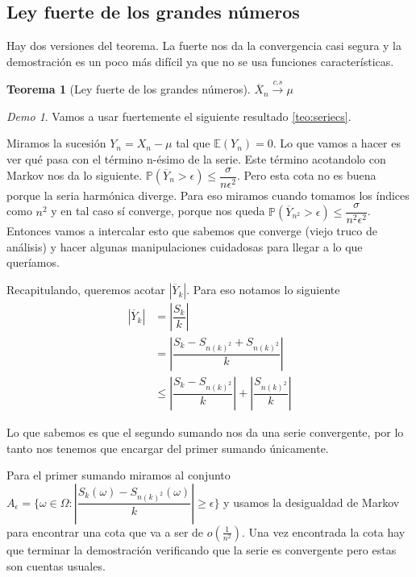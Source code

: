 \documentclass[11pt]{article}
\theoremstyle{plain} %
\newtheorem{teorema}{Teorema}
\theoremstyle{definition}
\theoremstyle{remark}
\newtheorem*{demo}{Demo}
\def\Om{\Omega}
\def\E{\mathbb{E}}
\def\P{\mathbb{P}}
\renewcommand\qed{\ding{110}}
\begin{document}
\subsection{Ley fuerte de los grandes números}

Hay dos versiones del teorema. La fuerte nos da la convergencia casi segura y la demostración es un poco más difícil ya que no se usa funciones características. 

\begin{teorema}
	[Ley fuerte de los grandes números]
	$\overline{X}_{n} \overset{c.s}{\to} \mu$	
\end{teorema}

\begin{demo}
	Vamos a usar fuertemente el siguiente resultado \ref{teo:seriecs}.
	
	Miramos la sucesión $Y_n = X_n - \mu$ tal que $\E(Y_n) = 0$. Lo que vamos a hacer es ver qué pasa con el término n-ésimo de la serie. Este término acotandolo con Markov nos da lo siguiente.
	$\P(\overline{Y}_{n} > \epsilon) \leq \dfrac{\sigma}{n\epsilon^2}$. Pero esta cota no es buena porque la seria harmónica diverge. Para eso miramos cuando tomamos los índices como $n^2$ y en tal caso sí converge, porque nos queda $\P(\overline{Y}_{n^2} > \epsilon) \leq \dfrac{\sigma}{n^2\epsilon^2}$. Entonces vamos a intercalar esto que sabemos que converge (viejo truco de análisis) y hacer algunas manipulaciones cuidadosas para llegar a lo que queríamos.
	
	Recapitulando, queremos acotar $|\overline{Y}_{k}|$. Para eso notamos lo siguiente
	\begin{align*}
		\left|\overline{Y}_{k}\right|  &= \left| \dfrac{S_k}{k}\right|  \\
		&= \left| \dfrac{S_k - S_{n(k)^2} + S_{n(k)^2}}{k}\right| \\
		& \leq \left| \dfrac{S_k - S_{n(k)^2}}{k}\right|  + \left|  \dfrac{S_{n(k)^2}}{k}\right| 
	\end{align*}	
	
Lo que sabemos es que el segundo sumando nos da una serie convergente, por lo tanto nos tenemos que encargar del primer sumando únicamente.

Para el primer sumando miramos al conjunto \\
$A_\epsilon = \{ \omega \in \Om : \left| \dfrac{S_k (\omega) - S_{n(k)^2}(\omega)}{k} \right| \geq \epsilon \}$ y usamos la desigualdad de Markov para encontrar una cota que va a ser de $o(\frac{1}{n^2})$. Una vez encontrada la cota hay que terminar la demostración verificando que la serie es convergente pero estas son cuentas usuales.
\qed
\end{demo}
\end{document}
